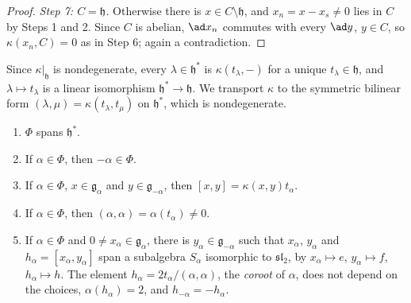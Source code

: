 \begin{proof}
\emph{Step 7: $C = \mathfrak{h}$.} Otherwise there is $x \in C \setminus \mathfrak{h}$, and $x_n = x - x_s \neq 0$ lies in $C$ by Steps 1 and 2. Since $C$ is abelian, $\ad x_n$
commutes with every $\ad y$, $y \in C$, so $\kappa(x_n, C) = 0$ as in Step 6; again a contradiction.
\end{proof}

Since $\kappa|_{\mathfrak{h}}$ is nondegenerate, every $\lambda \in \mathfrak{h}^*$ is $\kappa(t_\lambda, -)$ for a unique $t_\lambda \in \mathfrak{h}$, and $\lambda \mapsto t_\lambda$ is a
linear isomorphism $\mathfrak{h}^* \to \mathfrak{h}$. We transport $\kappa$ to the symmetric bilinear form $(\lambda, \mu) = \kappa(t_\lambda, t_\mu)$ on $\mathfrak{h}^*$, which is
nondegenerate.

\begin{proposition}\label{representation-theory:proposition-roots-sl2}
\begin{enumerate}
\item $\Phi$ spans $\mathfrak{h}^*$.
\item If $\alpha \in \Phi$, then $-\alpha \in \Phi$.
\item If $\alpha \in \Phi$, $x \in \mathfrak{g}_\alpha$ and $y \in \mathfrak{g}_{-\alpha}$, then $[x, y] = \kappa(x, y)t_\alpha$.
\item If $\alpha \in \Phi$, then $(\alpha, \alpha) = \alpha(t_\alpha) \neq 0$.
\item If $\alpha \in \Phi$ and $0 \neq x_\alpha \in \mathfrak{g}_\alpha$, there is $y_\alpha \in \mathfrak{g}_{-\alpha}$ such that $x_\alpha$, $y_\alpha$ and
$h_\alpha = [x_\alpha, y_\alpha]$ span a subalgebra $S_\alpha$ isomorphic to $\mathfrak{sl}_2$, by $x_\alpha \mapsto e$, $y_\alpha \mapsto f$, $h_\alpha \mapsto h$. The element
$h_\alpha = 2t_\alpha/(\alpha, \alpha)$, the \emph{coroot} of $\alpha$, does not depend on the choices, $\alpha(h_\alpha) = 2$, and $h_{-\alpha} = -h_\alpha$.
\end{enumerate}
\end{proposition}

